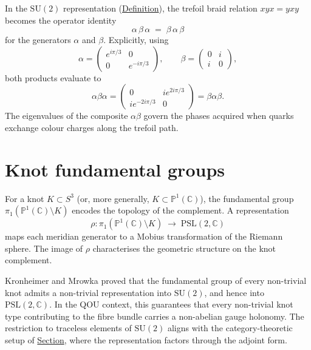 \begin{example}
  \label{ex:trefoil-operator-algebra}
In the $\mathrm{SU}(2)$ representation
(\hyperref[def:su2-generators]{Definition}), the trefoil braid relation
$xyx=yxy$ becomes the operator identity
\[
\alpha\,\beta\,\alpha
  \;=\;\beta\,\alpha\,\beta
\]
for the generators $\alpha$ and
$\beta$.  Explicitly, using
\[
\alpha=\begin{pmatrix}e^{i\pi/3}&0\\0&e^{-i\pi/3}\end{pmatrix},
  \qquad
  \beta=\begin{pmatrix}0&i\\i&0\end{pmatrix},
\]
both products evaluate to
\[
\alpha\beta\alpha
  = \begin{pmatrix}0&ie^{2i\pi/3}\\ie^{-2i\pi/3}&0\end{pmatrix}
  = \beta\alpha\beta.
\]
The eigenvalues of the composite $\alpha\beta$ govern the phases
acquired when quarks exchange colour charges along the trefoil path.
\end{example}

\section{Knot fundamental groups}
\label{sec:knot-fundamental-groups}



\begin{remark}
  \label{rem:knot-complement-group}
For a knot $K\subset S^3$ (or, more generally,
$K\subset\mathbb{P}^1(\mathbb{C})$), the fundamental group
$\pi_1(\mathbb{P}^1(\mathbb{C})\setminus K)$ encodes the topology of the
complement.  A representation
\[
\rho\colon\pi_1(\mathbb{P}^1(\mathbb{C})\setminus K)
  \;\longrightarrow\;\mathrm{PSL}(2,\mathbb{C})
\]
maps each meridian generator to a Mobius transformation of the
Riemann sphere.  The image of $\rho$ characterises the geometric
structure on the knot complement.
\end{remark}

\begin{remark}
  \label{rem:kronheimer-mrowka}
Kronheimer and Mrowka proved that the fundamental group of every
non-trivial knot admits a non-trivial representation into
$\mathrm{SU}(2)$, and hence into
$\mathrm{PSL}(2,\mathbb{C})$.  In the
QOU context, this guarantees that every non-trivial knot type
contributing to the fibre bundle carries a non-abelian gauge holonomy.
The restriction to traceless elements of $\mathrm{SU}(2)$ aligns with
the category-theoretic setup of \hyperref[sec:enveloping-algebras]{Section},
where the representation factors through the adjoint form.
\end{remark}

